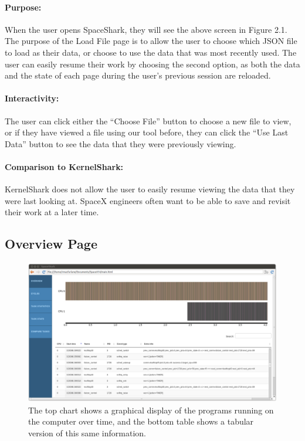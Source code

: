 \documentclass{hmcclinic}
\begin{document}
\paragraph{Purpose:}
When the user opens SpaceShark, they will see the above screen in Figure 2.1.
The purpose of the Load File page is to allow the user to choose which JSON file
to load as their data, or choose to use the data that was most recently used.
The user can easily resume their work by choosing the second option, as both the
data and the state of each page during the user's previous session are reloaded.

\paragraph{Interactivity:}
The user can click either the ``Choose File'' button to choose a new file to view, or if they have viewed a file using our tool before, they can click the ``Use Last Data'' button to see the data that they were previously viewing.

\paragraph{Comparison to KernelShark:}
KernelShark does not allow the user to easily resume viewing the data that they were last looking at. SpaceX engineers often want to be able to save and revisit their work at a later time. 


  \subsection{Overview Page} 
  
  \begin{figure}[H]
  \centering
      \includegraphics[width=5in]{overview-page.png}
  \caption{The top chart shows a graphical display of the programs running on the computer over time, and the bottom table shows a tabular version of this same information.}
  \end{figure}
\end{document}
